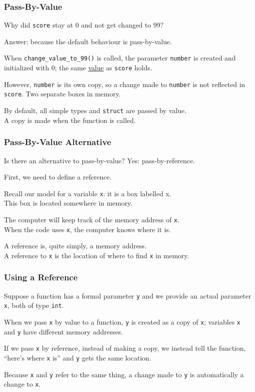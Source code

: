 \begin{frame}
\frametitle{Pass-By-Value}
Why did \texttt{score} stay at 0 and not get changed to 99?

Answer: because the default behaviour is \alert{pass-by-value}.

When \texttt{change\_value\_to\_99()} is called, the parameter \texttt{number} is created and initialized with 0; the same \underline{value} as \texttt{score} holds.

However, \texttt{number} is its own copy, so a change made to \texttt{number} is not reflected in \texttt{score}. Two separate boxes in memory.

By default, all simple types and \texttt{struct} are passed by value.\\
\quad A copy is made when the function is called.

\end{frame}

\begin{frame}
\frametitle{Pass-By-Value Alternative}
Is there an alternative to pass-by-value? Yes: \alert{pass-by-reference}.

First, we need to define a \alert{reference}.

Recall our model for a variable \texttt{x}: it is a box labelled x.\\
\quad This box is located somewhere in memory.

The computer will keep track of the memory address of \texttt{x}.\\
\quad When the code uses \texttt{x}, the computer knows where it is.

A reference is, quite simply, a memory address.\\
\quad A reference to \texttt{x} is the location of where to find \texttt{x} in memory.

\end{frame}

\begin{frame}
\frametitle{Using a Reference}
Suppose a function has a formal parameter \texttt{y} and we provide an actual parameter \texttt{x}, both of type \texttt{int}.

When we pass \texttt{x} by value to a function, \texttt{y} is created as a copy of \texttt{x}; variables \texttt{x} and \texttt{y} have different memory addresses.

If we pass \texttt{x} by reference, instead of making a copy, we instead tell the function, ``here's where \texttt{x} is'' and \texttt{y} gets the same location.

Because \texttt{x} and \texttt{y} refer to the same thing, a change made to \texttt{y} is automatically a change to \texttt{x}.

\end{frame}

